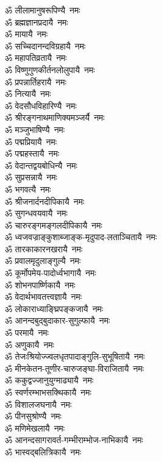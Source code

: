 \begin{multicols}{2}
\begin{flushleft}
ॐ लीलामानुषरूपिण्यै~नमः\\
ॐ ब्रह्मज्ञानप्रदायै~नमः\\
ॐ मायायै~नमः\hfill{}\\
ॐ सच्चिदानन्दविग्रहायै~नमः\\
ॐ महापतिव्रतायै~नमः\\
ॐ विष्णुगुणकीर्तनलोलुपायै~नमः\\
ॐ प्रपन्नार्तिहरायै~नमः\\
ॐ नित्यायै~नमः\\
ॐ वेदसौधविहारिण्यै~नमः\\
ॐ श्रीरङ्गनाथमाणिक्यमञ्जर्यै~नमः\\
ॐ मञ्जुभाषिण्यै~नमः\\
ॐ पद्मप्रियायै~नमः\\
ॐ पद्महस्तायै~नमः\hfill{}\\
ॐ वेदान्तद्वयबोधिन्यै~नमः\\
ॐ सुप्रसन्नायै~नमः\\
ॐ भगवत्यै~नमः\\
ॐ श्रीजनार्दनदीपिकायै~नमः\\
ॐ सुगन्धवयवायै~नमः\\
ॐ चारुरङ्गमङ्गलदीपिकायै~नमः\\
ॐ ध्वजवज्राङ्कुशाब्जाङ्क-मृदुपाद-लताञ्चितायै~नमः\\
ॐ तारकाकारनखरायै~नमः\\
ॐ प्रवालमृदुलाङ्गुल्यै~नमः\\
ॐ कूर्मोपमेय-पादोर्ध्वभागायै~नमः\hfill{}\\
ॐ शोभनपार्ष्णिकायै~नमः\\
ॐ वेदार्थभावतत्त्वज्ञायै~नमः\\
ॐ लोकाराध्याङ्घ्रिपङ्कजायै~नमः\\
ॐ आनन्दबुद्बुदाकार-सुगुल्फायै~नमः\\
ॐ परमायै~नमः\\
ॐ अणुकायै~नमः\\
ॐ तेजःश्रियोज्ज्वलधृतपादाङ्गुलि-सुभूषितायै~नमः\\
ॐ मीनकेतन-तूणीर-चारुजङ्घा-विराजितायै~नमः\\
ॐ ककुद्वज्जानुयुग्माढ्यायै~नमः\\
ॐ स्वर्णरम्भाभसक्थिकायै~नमः\hfill{}\\
ॐ विशालजघनायै~नमः\\
ॐ पीनसुश्रोण्यै~नमः\\
ॐ मणिमेखलायै~नमः\\
ॐ आनन्दसागरावर्त-गम्भीराम्भोज-नाभिकायै~नमः\\
ॐ भास्वद्बलित्रिकायै~नमः\\

\end{flushleft}
\end{multicols}
